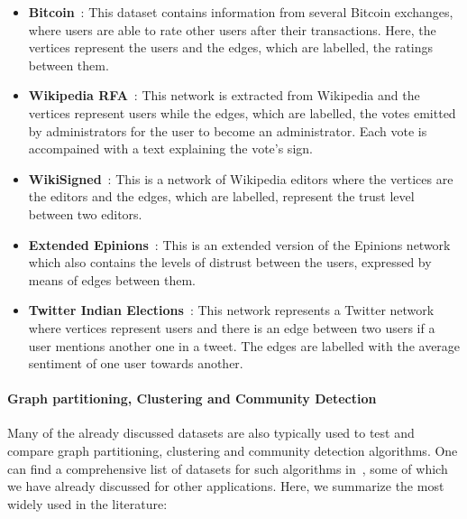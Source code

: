   \begin{itemize}
    \item \textbf{Bitcoin}~\cite{moore2013beware}: This dataset contains information from
      several Bitcoin exchanges, where users are able to rate other users after
      their transactions. Here, the vertices represent the users and the edges,
      which are labelled, the ratings between them.
    \item \textbf{Wikipedia RFA}~\cite{west2014exploiting}: This network is extracted
      from Wikipedia and the vertices represent users  while the
      edges, which are labelled, the votes emitted by administrators for the
      user to become an administrator.  Each vote is accompained with a text
      explaining the vote's sign.
    \item \textbf{WikiSigned}~\cite{maniu2011building}: This is a network of Wikipedia
      editors where the vertices are the editors and the edges, which are
      labelled, represent the trust level between two editors.
    \item \textbf{Extended Epinions}~\cite{massa2007trust}: This is an extended version of
      the Epinions network which also contains the levels of distrust between the
      users, expressed by means of edges between them.
    \item \textbf{Twitter Indian Elections}~\cite{kagan2015using}: This network represents
      a Twitter network where vertices represent users and there is an edge
      between two users if a user mentions another one in a tweet. The edges
      are labelled with the average sentiment of one user towards another.
  \end{itemize}


\paragraph{Graph partitioning, Clustering and Community Detection}

Many of the already discussed datasets are also typically used to test and
compare graph partitioning, clustering and community detection algorithms. One
can find a comprehensive list of datasets for such algorithms
in~\cite{10dimacs,yang2015defining}, some of which we have already discussed for other
applications. Here, we summarize the most widely used in the literature:

